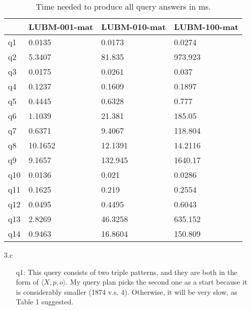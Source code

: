 \documentclass{article}
\begin{document}
\begin{enumerate}
\begin{table}[H]\centering
\begin{tabular}{|l|l|l|l|}
\hline
    & LUBM-001-mat & LUBM-010-mat & LUBM-100-mat \\ \hline
q1  & 0.0135       & 0.0173       & 0.0274       \\ \hline
q2  & 5.3407       & 81.835       & 973.923      \\ \hline
q3  & 0.0175       & 0.0261       & 0.037        \\ \hline
q4  & 0.1237       & 0.1609       & 0.1897       \\ \hline
q5  & 0.4445       & 0.6328       & 0.777        \\ \hline
q6  & 1.1039       & 21.381       & 185.05       \\ \hline
q7  & 0.6371       & 9.4067       & 118.804      \\ \hline
q8  & 10.1652      & 12.1391      & 14.2116      \\ \hline
q9  & 9.1657       & 132.945      & 1640.17      \\ \hline
q10 & 0.0136       & 0.021        & 0.0286       \\ \hline
q11 & 0.1625       & 0.219        & 0.2554       \\ \hline
q12 & 0.0495       & 0.4495       & 0.6043       \\ \hline
q13 & 2.8269       & 46.3258      & 635.152      \\ \hline
q14 & 0.9463       & 16.8604      & 150.809      \\ \hline
\end{tabular}
\caption{Time needed to produce  all query answers in ms.}
\end{table}

\item[3.c]
\begin{enumerate}
\item[q1:] This query consists of two triple patterns, and they are both in the form of $\langle X, p, o\rangle$. My query plan picks the second one as a start because it is considerably smaller (1874 v.s. 4). Otherwise, it will be very slow, as Table 1 suggested. 


\end{enumerate}
\end{enumerate}
\end{document}
